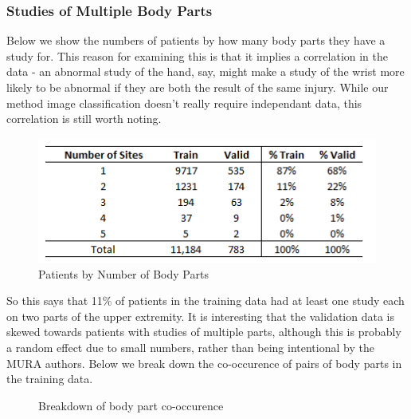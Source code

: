 \documentclass[11pt]{article} %
\theoremstyle{plain}
\theoremstyle{definition}
\begin{document}
\subsubsection{Studies of Multiple Body Parts}
Below we show the numbers of patients by how many body parts they have a study for. This reason for examining this is that it implies a correlation in the data - an abnormal study of the hand, say, might make a study of the wrist more likely to be abnormal if they are both the result of the same injury. While our method image classification doesn't really require independant data, this correlation is still worth noting.
\begin{figure}[!ht]
    \centering    
    \caption{Patients by Number of Body Parts}
    \label{fig:PatientsByNumberOfSites}
    \includegraphics[scale=0.7]{MURA-Breakdowns/PatientsByNumberOfSites.PNG}
\end{figure}
\FloatBarrier
\noindent
So this says that 11\% of patients in the training data had at least one study each on two parts of the upper extremity. It is interesting that the validation data is skewed towards patients with studies of multiple parts, although this is probably a random effect due to small numbers, rather than being intentional by the MURA authors. Below we break down the co-occurence of pairs of body parts in the training data. 
\begin{figure}[!ht]
\centering
{}
\newline
{}
\caption{Breakdown of body part co-occurence}
\label{fig:PartCoOccurence_Breakdown}
\end{figure}
\end{document}

